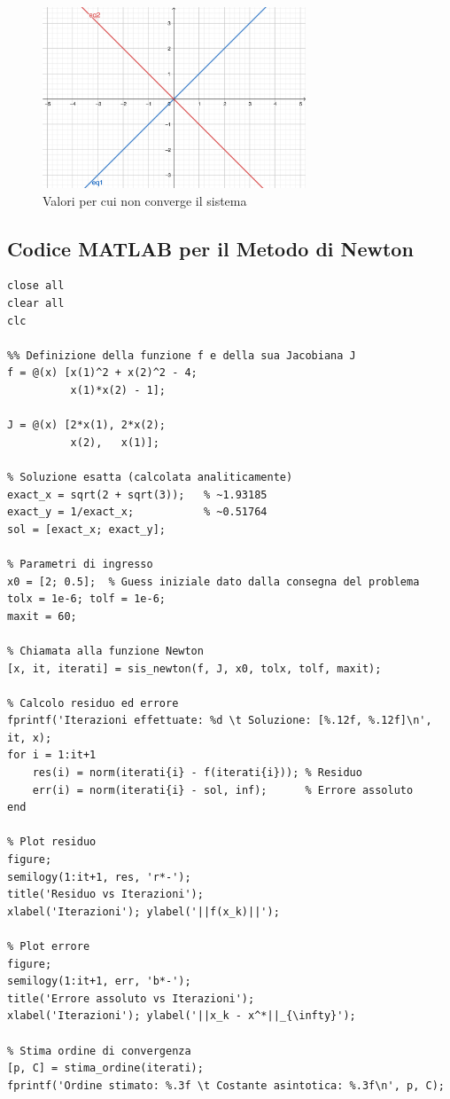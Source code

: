 \documentclass[11pt]{article}
\begin{document}
\begin{figure}[H]
  \centering
  \includegraphics[width=0.7\textwidth]{images/exist.png} 
  \caption{Valori per cui non converge il sistema}
  \label{fig:esiste?}
\end{figure}


\subsection*{Codice MATLAB per il Metodo di Newton}

\begin{lstlisting}
close all
clear all
clc

%% Definizione della funzione f e della sua Jacobiana J
f = @(x) [x(1)^2 + x(2)^2 - 4;
          x(1)*x(2) - 1];

J = @(x) [2*x(1), 2*x(2);
          x(2),   x(1)];

% Soluzione esatta (calcolata analiticamente)
exact_x = sqrt(2 + sqrt(3));   % ~1.93185
exact_y = 1/exact_x;           % ~0.51764
sol = [exact_x; exact_y];

% Parametri di ingresso
x0 = [2; 0.5];  % Guess iniziale dato dalla consegna del problema
tolx = 1e-6; tolf = 1e-6;
maxit = 60;

% Chiamata alla funzione Newton
[x, it, iterati] = sis_newton(f, J, x0, tolx, tolf, maxit);

% Calcolo residuo ed errore
fprintf('Iterazioni effettuate: %d \t Soluzione: [%.12f, %.12f]\n', it, x);
for i = 1:it+1
    res(i) = norm(iterati{i} - f(iterati{i})); % Residuo
    err(i) = norm(iterati{i} - sol, inf);      % Errore assoluto
end

% Plot residuo
figure;
semilogy(1:it+1, res, 'r*-');
title('Residuo vs Iterazioni');
xlabel('Iterazioni'); ylabel('||f(x_k)||');

% Plot errore
figure;
semilogy(1:it+1, err, 'b*-');
title('Errore assoluto vs Iterazioni');
xlabel('Iterazioni'); ylabel('||x_k - x^*||_{\infty}');

% Stima ordine di convergenza
[p, C] = stima_ordine(iterati); 
fprintf('Ordine stimato: %.3f \t Costante asintotica: %.3f\n', p, C);
\end{lstlisting}
\end{document}
